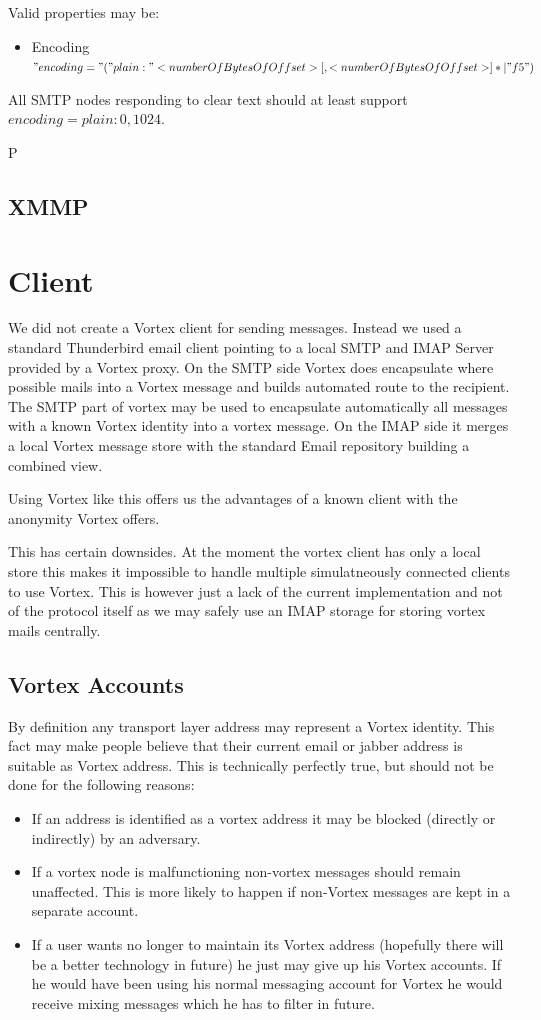 Valid properties may be:
\begin{itemize}
	\item Encoding $"encoding="("plain:"<numberOfBytesOfOffset>[,<numberOfBytesOfOffset>]*|"f5")$
\end{itemize}

All SMTP nodes responding to clear text should at least support $encoding=plain:0,1024$.

               P
\subsection{XMMP}

\section{Client}
We did not create a Vortex client for sending messages. Instead we used a standard Thunderbird email client pointing to a local SMTP and IMAP Server provided by a Vortex proxy. On the SMTP side Vortex does encapsulate where possible mails into a Vortex message and builds automated route to the recipient. The SMTP part of vortex may be used to encapsulate automatically all messages with a known Vortex identity into a vortex message. On the IMAP side it merges a local Vortex message store with the standard Email repository building a combined view.

Using Vortex like this offers us the advantages of a known client with the anonymity Vortex offers.

This has certain downsides. At the moment the vortex client has only a local store this makes it impossible to handle multiple simulatneously connected clients to use Vortex. This is however just a lack of the current implementation and not of the protocol itself as we may safely use an IMAP storage for storing vortex mails centrally.

\subsection{Vortex Accounts}
By definition any transport layer address may represent a Vortex identity. This fact may make people believe that their current email or jabber address is suitable as Vortex address. This is technically perfectly true, but should not be done for the following reasons:

\begin{itemize}
	\item If an address is identified as a vortex address it may be blocked (directly or indirectly) by an adversary.
	\item If a vortex node is malfunctioning non-vortex messages should remain unaffected. This is more likely to happen if non-Vortex messages are kept in a separate account.
	\item If a user wants no longer to maintain its Vortex address (hopefully there will be a better technology in future) he just may give up his Vortex accounts. If he would have been using his normal messaging account for Vortex he would receive mixing messages which he has to filter in future.
\end{itemize}

